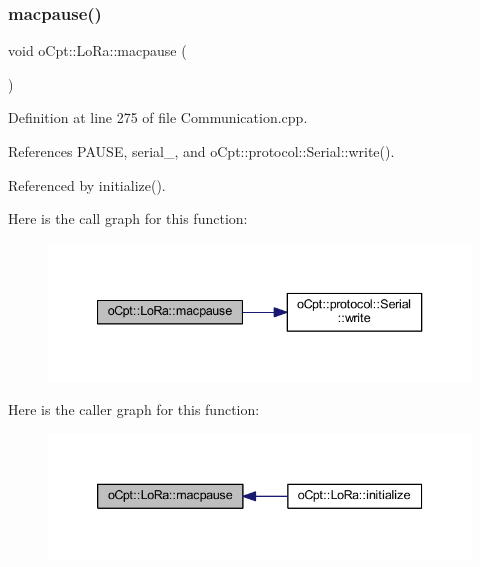 \subsubsection{\texorpdfstring{macpause()}{macpause()}}
{\footnotesize\ttfamily void o\+Cpt\+::\+Lo\+Ra\+::macpause (\begin{DoxyParamCaption}{ }\end{DoxyParamCaption})\hspace{0.3cm}{\ttfamily [protected]}}



Definition at line 275 of file Communication.\+cpp.



References P\+A\+U\+SE, serial\+\_\+, and o\+Cpt\+::protocol\+::\+Serial\+::write().



Referenced by initialize().

Here is the call graph for this function\+:\nopagebreak
\begin{figure}[H]
\begin{center}
\leavevmode
\includegraphics[width=340pt]{classo_cpt_1_1_lo_ra_ac1042fa7b446ce798317a529b6425a4f_cgraph}
\end{center}
\end{figure}
Here is the caller graph for this function\+:\nopagebreak
\begin{figure}[H]
\begin{center}
\leavevmode
\includegraphics[width=339pt]{classo_cpt_1_1_lo_ra_ac1042fa7b446ce798317a529b6425a4f_icgraph}
\end{center}
\end{figure}
\hypertarget{classo_cpt_1_1_lo_ra_a606eeaec7fb73b483f958005444246b4}{}\label{classo_cpt_1_1_lo_ra_a606eeaec7fb73b483f958005444246b4} 
